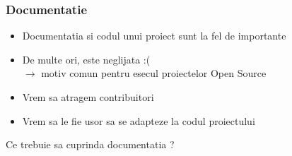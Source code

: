 \documentclass{beamer}
\begin{document}
  \begin{frame}[allowframebreaks]
  \frametitle{Documentatie}
  \begin{itemize}
  \item Documentatia si codul unui proiect sunt la fel de importante
  \item De multe ori, este neglijata :( \\ $\rightarrow$ motiv comun pentru esecul proiectelor Open Source \\ \vspace{1.5cm}
  \item Vrem sa atragem contribuitori
  \item Vrem sa le fie usor sa se adapteze la codul proiectului
  \end{itemize}
  \framebreak
  Ce trebuie sa cuprinda documentatia ?\\
  \end{frame}
\end{document}
